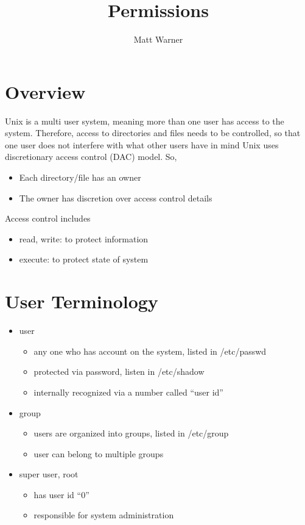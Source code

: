 \documentclass{report}
\title{\Huge{Permissions}}
\author{\huge{Matt Warner}}
\date{\huge{}}
\begin{document}
  \maketitle
  \section{Overview}
  Unix is a multi user system, meaning more than one user has access to the system. Therefore, access to directories and files needs to be controlled, so that one user does not interfere with what other users have in mind
  \bigbreak \noindent
  Unix uses discretionary access control (DAC)  model. So,
  \begin{itemize}
    \item Each directory/file has an owner 
    \item The owner has discretion over access control details
  \end{itemize}
  Access control includes
  \begin{itemize}
    \item read, write: to protect information 
    \item execute: to protect state of system
  \end{itemize}
  \section{User Terminology}
  \begin{itemize}
    \item user 
      \begin{itemize}
        \item any one who has account on the system, listed in /etc/passwd 
          \item protected via password, listen in /etc/shadow
          \item internally recognized via a number called ``user id''
      \end{itemize}
    \item group
      \begin{itemize}
        \item users are organized into groups, listed in /etc/group 
        \item user can belong to multiple groups
      \end{itemize}
    \item super user, root
      \begin{itemize}
        \item has user id ``0'' 
        \item responsible for system administration
      \end{itemize}
  \end{itemize}
\end{document}
